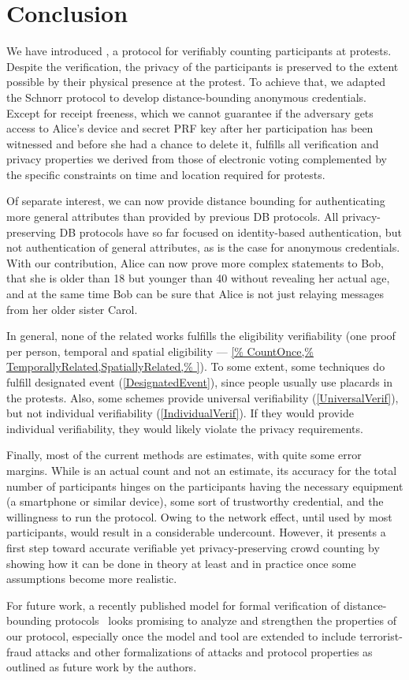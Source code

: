 \section{Conclusion}%
\label{Conclusion}

We have introduced \PRIVO, a protocol for verifiably counting participants at protests. Despite the verification, the privacy of the
participants is preserved to the extent possible by their physical
presence at the protest. To achieve that, we adapted the Schnorr
protocol to develop distance-bounding anonymous credentials. Except for receipt
freeness, which we cannot guarantee if the adversary gets access to
Alice's device and secret PRF key after her participation has
been witnessed and before she had a chance to
delete it, \PRIVO
fulfills all verification and privacy properties we derived from those
of electronic voting complemented by the specific constraints on time
and location required for protests. 

Of separate interest, we can now provide distance bounding for authenticating 
more general attributes than provided by previous \ac{DB} protocols.
All privacy-preserving \ac{DB} protocols have so far focused on identity-based 
authentication, but not authentication of general attributes, as is the case 
for anonymous credentials.
With our contribution, Alice can now prove more complex statements to Bob, \eg 
that she is older than 18 but younger than 40 without revealing her actual age,  
and at the same time Bob can be sure that Alice is not just relaying messages 
from her older sister Carol.

In general, none of the related works fulfills the eligibility
verifiability (one proof per person, temporal and spatial eligibility ---
\cref{%
  CountOnce,%
  TemporallyRelated,SpatiallyRelated,%
}).
To some extent, some techniques do fulfill designated event (\cref{DesignatedEvent}), since people 
usually use placards in the protests.
Also, some schemes provide universal verifiability (\cref{UniversalVerif}), but 
not individual verifiability (\cref{IndividualVerif}).
If they would provide individual verifiability, they would likely violate the 
privacy requirements.

Finally, most of the current methods are estimates, with quite some error 
margins. While \PRIVO is an actual count and not an estimate, its
accuracy for the total number of participants hinges on the
participants having the necessary equipment (a smartphone or similar
device), some sort of trustworthy credential, and the willingness to
run the protocol. Owing to the network effect, until used by most participants, \PRIVO would result in a
considerable undercount. However, it presents a first
step toward accurate verifiable yet privacy-preserving crowd counting
by showing how it can be done in theory at least and in practice once
some assumptions become more realistic. 

For future work, a recently published model for formal verification
of distance-bounding protocols~\cite{TamarinDB} looks promising to
analyze and strengthen the properties of our protocol, especially once
the model and tool are extended to include terrorist-fraud attacks and
other formalizations of attacks and protocol properties as outlined as
future work by the authors.

